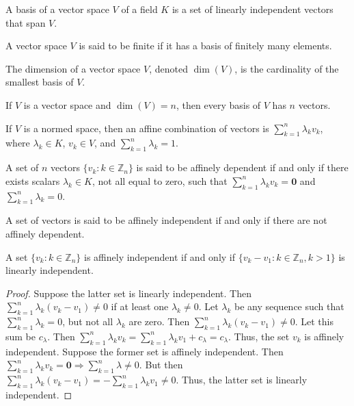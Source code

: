             \begin{definition}
            A basis of a vector space $V$ of a field $K$ is a set of linearly independent vectors that span $V$.
            \end{definition}
            \begin{definition}
            A vector space $V$ is said to be finite if it has a basis of finitely many elements.
            \end{definition}
            \begin{definition}
            The dimension of a vector space $V$, denoted $\dim(V)$, is the cardinality of the smallest basis of $V$.
            \end{definition}
            \begin{theorem}
            If $V$ is a vector space and $\dim(V)=n$, then every basis of $V$ has $n$ vectors.
            \end{theorem}
            \begin{definition}
            If $V$ is a normed space, then an affine combination of vectors is $\sum_{k=1}^{n} \lambda_k v_k$, where $\lambda_k \in K$, $v_k \in V$, and $\sum_{k=1}^{n} \lambda_k = 1$.
            \end{definition}
            \begin{definition}
            A set of $n$ vectors $\{v_k:k\in \mathbb{Z}_n\}$ is said to be affinely dependent if and only if there exists scalars $\lambda_k \in K$, not all equal to zero, such that $\sum_{k=1}^{n} \lambda_k v_k = \mathbf{0}$ and $\sum_{k=1}^{n} \lambda_k = 0$.
            \end{definition}
            \begin{definition}
            A set of vectors is said to be affinely independent if and only if there are not affinely dependent.
            \end{definition}
            \begin{theorem}
            A set $\{v_k:k\in \mathbb{Z}_n\}$ is affinely independent if and only if $\{v_k-v_1:k\in \mathbb{Z}_n, k>1\}$ is linearly independent.
            \end{theorem}
            \begin{proof}
            Suppose the latter set is linearly independent. Then $\sum_{k=1}^{n} \lambda_k(v_k-v_1) \ne 0$ if at least one $\lambda_k \ne 0$. Let $\lambda_k$ be any sequence such that $\sum_{k=1}^{n} \lambda_k = 0$, but not all $\lambda_k$ are zero. Then $\sum_{k=1}^{n} \lambda_k(v_k-v_1)\ne 0$. Let this sum be $c_{\lambda}$. Then $\sum_{k=1}^{n} \lambda_k v_k = \sum_{k=1}^{n} \lambda_k v_1 + c_\lambda = c_{\lambda}$. Thus, the set $v_k$ is affinely independent. Suppose the former set is affinely independent. Then $\sum_{k=1}^{n} \lambda_k v_k = \mathbf{0} \Rightarrow \sum_{k=1}^{n} \lambda \ne 0$. But then $\sum_{k=1}^{n}\lambda_k (v_k-v_1) = - \sum_{k=1}^{n} \lambda_k v_1 \ne 0$. Thus, the latter set is linearly independent.
            \end{proof}
